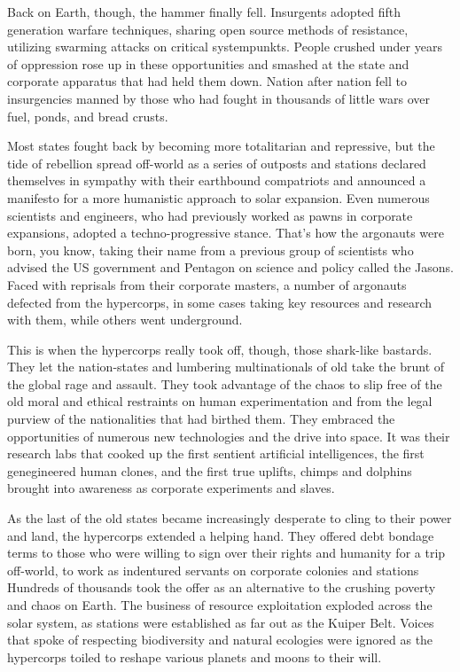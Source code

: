Back on Earth, though, the hammer finally fell. Insurgents
adopted fifth generation warfare techniques,
sharing open source methods of resistance, utilizing 
swarming attacks on critical systempunkts. People 
crushed under years of oppression rose up in these 
opportunities and smashed at the state and corporate 
apparatus that had held them down. Nation after 
nation fell to insurgencies manned by those who had 
fought in thousands of little wars over fuel, ponds, 
and bread crusts.

Most states fought back by becoming more totalitarian
and repressive, but the tide of rebellion spread
off-world as a series of outposts and stations declared 
themselves in sympathy with their earthbound compatriots
and announced a manifesto for a more humanistic
approach to solar expansion. Even numerous
scientists and engineers, who had previously worked 
as pawns in corporate expansions, adopted a techno-progressive
stance. That's how the argonauts were
born, you know, taking their name from a previous 
group of scientists who advised the US government 
and Pentagon on science and policy called the Jasons. 
Faced with reprisals from their corporate masters, a 
number of argonauts defected from the hypercorps, 
in some cases taking key resources and research with 
them, while others went underground.

This is when the hypercorps really took off, though, 
those shark-like bastards. They let the nation-states 
and lumbering multinationals of old take the brunt 
of the global rage and assault. They took advantage 
of the chaos to slip free of the old moral and ethical 
restraints on human experimentation and from the 
legal purview of the nationalities that had birthed 
them. They embraced the opportunities of numerous 
new technologies and the drive into space. It was their 
research labs that cooked up the first sentient artificial 
intelligences, the first genegineered human clones, and 
the first true uplifts, chimps and dolphins brought 
into awareness as corporate experiments and slaves.

As the last of the old states became increasingly 
desperate to cling to their power and land, the hypercorps
extended a helping hand. They offered debt
bondage terms to those who were willing to sign over 
their rights and humanity for a trip off-world, to work 
as indentured servants on corporate colonies and stations
Hundreds of thousands took the offer as an alternative
to the crushing poverty and chaos on Earth.
The business of resource exploitation exploded across 
the solar system, as stations were established as far 
out as the Kuiper Belt. Voices that spoke of respecting 
biodiversity and natural ecologies were ignored as 
the hypercorps toiled to reshape various planets and 
moons to their will.

